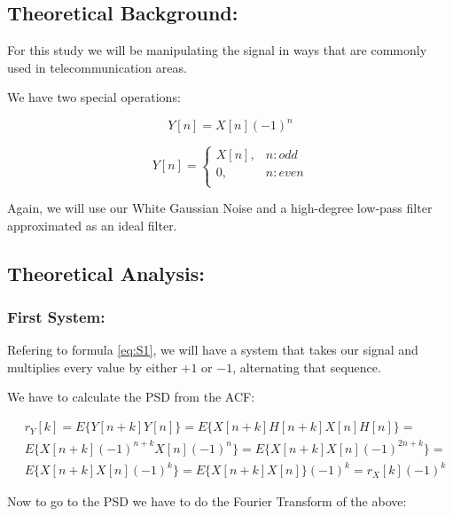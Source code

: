 \documentclass[a4paper,11pt]{article}
\begin{document}
\subsection{Theoretical Background:}

For this study we will be manipulating the signal in ways that are commonly
used in telecommunication areas.

We have two special operations:

\begin{equation}\label{eq:S1}
  Y[n] = X[n](-1)^n
\end{equation}

\begin{equation}
  Y[n] =
    \begin{cases}\label{eq:S2}
        X[n], & n: odd\\
        0,    & n: even\\
    \end{cases}
\end{equation}

Again, we will use our White Gaussian Noise and a high-degree low-pass filter
approximated as an ideal filter.

\subsection{Theoretical Analysis:}

\subsubsection{First System:}

Refering to formula \eqref{eq:S1}, we will have a system that takes our signal
and multiplies every value by either $+1$ or $-1$, alternating that sequence.

We have to calculate the PSD from the ACF:

\begin{equation}\label{eq:ACF_S1}
  \begin{split}
    & r_Y[k] = E\{Y[n+k]Y[n]\} =  E\{X[n+k]H[n+k]X[n]H[n]\} = \\
    & E\{X[n+k](-1)^{n+k}X[n](-1)^n\} = E\{X[n+k]X[n](-1)^{2n+k}\} = \\
    & E\{X[n+k]X[n](-1)^k\} = E\{X[n+k]X[n]\}(-1)^k = r_X[k](-1)^k
  \end{split}
\end{equation}

Now to go to the PSD we have to do the Fourier Transform of the above:
\end{document}
